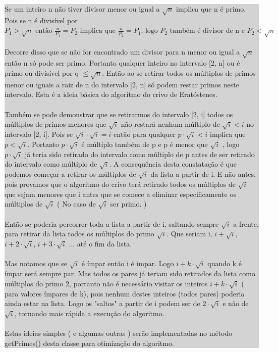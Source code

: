 \documentclass[a4paper,12pt,openany]{book}
\begin{document}
{\begin{minipage}{18cm}
	\end{minipage}	
	
}%

\newpage

\colorbox{lightgrey}{
	
	\begin{minipage}{18cm}
		Se um inteiro n não tiver divisor menor ou igual a $ \sqrt{n} $ implica que n é primo. Pois se n é divisível por $ P_1 > \sqrt{n} \text{ então } \frac{n}{P_1} = P_2 \text{ implica que } \frac{n}{P_2} = P_1 \text{, logo } P_2 \text{ também é divisor de n e } P_2 < \sqrt{n} $
		\\
		\\
		Decorre disso que se não for encontrado um divisor para n menor ou igual a $ \sqrt{n} $ então n só pode ser primo. Portanto qualquer inteiro no intervalo [2, n] ou é primo ou divisível por q $ \leq \sqrt{n} $. Então ao se retirar todos os múltiplos de primos menor ou iguais a raiz de n do intervalo [2, n] só podem restar primos neste intervalo. Esta é a ideia básica do algoritmo do crivo de Eratóstenes.
		\\
		\\
		Também se pode demonstrar que se retirarmos do intervalo [2, i] todos os múltiplos de primos menores que $ \sqrt{i}  $ não restará nenhum múltiplo de $ \sqrt{i} < i  $ no intervalo [2, i]. Pois se $ \sqrt{i} \cdot \sqrt{i} = i \text{ então para qualquer } p \cdot \sqrt{i} < i $  implica que $ p < \sqrt{i} $. Portanto $ p \cdot \sqrt{i}  $  é múltiplo também de p e p é menor que $  \sqrt{i} $ ,  logo $ p \cdot \sqrt{i}  $ já teria sido retirado do intervalo como múltiplo de p antes de ser retirado do intervalo como múltiplo de $ \sqrt{i} $. A consequência desta constatação é que podemos começar a retirar os múltiplos de $ \sqrt{i} $ da lista a partir de i. E não antes, pois provamos que o algoritmo do crivo terá retirado todos os múltiplos de $ \sqrt{i} $ que sejam menores que i antes que se comece a eliminar especificamente os múltiplos de $ \sqrt{i} $ ( No caso de $ \sqrt{i} $ ser primo. ) 
		\\
		\\
		Então se poderia percorrer toda a lista a partir de i, saltando sempre $ \sqrt{i} $ a frente, para retirar da lista todos os múltiplos do primo $ \sqrt{i} $. Que seriam i, $ i + \sqrt{i} $, $ i + 2 \cdot \sqrt{i} $, $ i + 3 \cdot \sqrt{i} $ ... até o fim da lista.
		\\
		\\
		Mas notamos que se $ \sqrt{i} $ é ímpar então i é impar. Logo $ i + k \cdot \sqrt{i} $ quando k é ímpar será sempre par. Mas todos os pares já teriam sido retirados da lista como múltiplos do primo 2, portanto não é necessário visitar os inteiros $ i + k \cdot \sqrt{i} $ ( para valores ímpares de k), pois nenhum destes inteiros (todos pares) poderia ainda estar na lista. Logo os "saltos" a partir de i podem ser de $ 2 \cdot \sqrt{i} $ e não de $ \sqrt{i} $, tornando mais rápida a execução do algoritmo.
		\\
		\\
		Estas ideias simples ( e algumas outras ) serão implementadas no método getPrimes() desta classe para otimização do algoritmo.


\end{minipage}}
\end{document}
